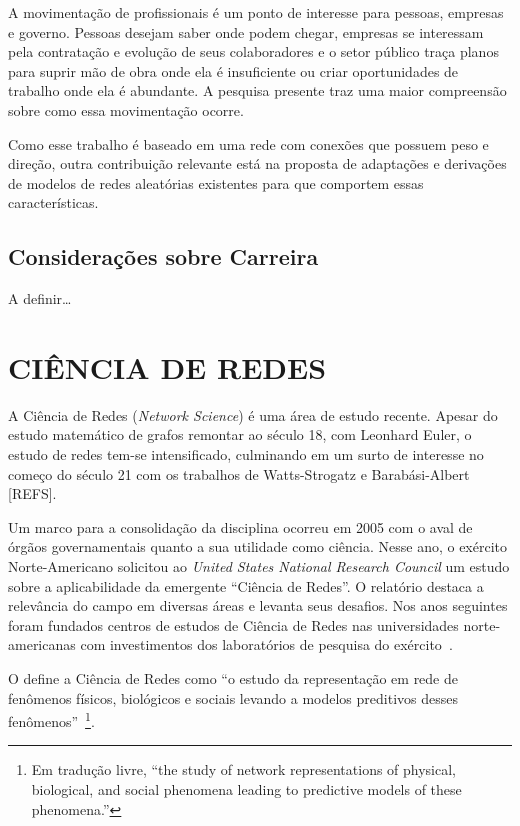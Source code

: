 \documentclass[12pt,a4paper]{article}
\theoremstyle{hypo}
\begin{document}
A movimentação de profissionais é um ponto de interesse para pessoas, empresas e governo. Pessoas desejam saber onde podem chegar, empresas se interessam pela contratação e evolução de seus colaboradores e o setor público traça planos para suprir mão de obra onde ela é insuficiente ou criar oportunidades de trabalho onde ela é abundante. A pesquisa presente traz uma maior compreensão sobre como essa movimentação ocorre.

Como esse trabalho é baseado em uma rede com conexões que possuem peso e direção, outra contribuição relevante está na proposta de adaptações e derivações de modelos de redes aleatórias existentes para que comportem essas características.


\subsection{Considerações sobre Carreira}

A definir\ldots


\section{CIÊNCIA DE REDES}

A Ciência de Redes (\textit{Network Science}) é uma área de estudo recente. Apesar do estudo matemático de grafos remontar ao século 18, com Leonhard Euler, o estudo de redes tem-se intensificado, culminando em um surto de interesse no começo do século 21 com os trabalhos de Watts-Strogatz e Barabási-Albert [{REFS}].

Um marco para a consolidação da disciplina ocorreu em 2005 com o aval de órgãos governamentais quanto a sua utilidade como ciência. Nesse ano, o exército Norte-Americano solicitou ao \textit{United States National Research Council} um estudo sobre a aplicabilidade da emergente \enquote{Ciência de Redes}. O relatório destaca a relevância do campo em diversas áreas e levanta seus desafios. Nos anos seguintes foram fundados centros de estudos de Ciência de Redes nas universidades norte-americanas com investimentos dos laboratórios de pesquisa do exército~\cite{Maxwell2009-kq}.

O  define a Ciência de Redes como \enquote{o estudo da representação em rede de fenômenos físicos, biológicos e sociais levando a modelos preditivos desses fenômenos}~\footnote{Em tradução livre, \enquote{the study of network representations of physical, biological, and social phenomena leading to predictive models of these phenomena.}}.
\end{document}
